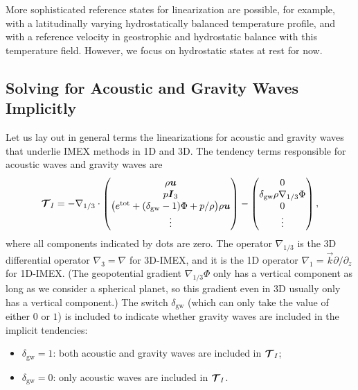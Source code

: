 \documentclass{report}
\begin{document}
{More sophisticated reference states for linearization are possible, for example, with a latitudinally varying hydrostatically balanced temperature profile, and with a reference velocity in geostrophic and hydrostatic balance with this temperature field. However, we focus on hydrostatic states at rest for now. 
 
 \subsection{Solving for Acoustic and Gravity Waves Implicitly}
 \label{s:IMEX_general}

Let us lay out in general terms the linearizations for acoustic and gravity waves that underlie IMEX methods in 1D and 3D. The tendency terms responsible for acoustic waves and gravity waves are
 \begin{equation}
 \boldsymbol{{\mathcal{T}}}_{I}= -\nabla_{1/3} \cdot
 \begin{pmatrix}
 \rho \boldsymbol{{u}} \\
 p \boldsymbol{{I}}_3 \\
 \bigl(e^{\mathrm{tot}} + (\delta_{\mathrm{gw}}-1) \Phi + p/\rho \bigr) \rho \boldsymbol{{u}} \\
 \vdots
 \end{pmatrix}
 - \begin{pmatrix}
 0 \\
 \delta_{\mathrm{gw}} \rho \nabla_{1/3} \Phi \\
 0\\
 \vdots
 \end{pmatrix},
 \label{eq:3d-imex/tendencies}
 \end{equation}
where all components indicated by dots are zero. The operator $\nabla_{1/3}$ is the 3D differential operator $\nabla_3 = \nabla$ for 3D-IMEX, and it is the 1D operator $\nabla_1 = \vec{k} \partial/\partial_z$ for 1D-IMEX. (The geopotential gradient $\nabla_{1/3} \Phi$ only has a vertical component as long as we consider a spherical planet, so this gradient even in 3D usually only has a vertical component.) The switch $\delta_{\mathrm{gw}}$ (which can only take the value of either $0$ or $1$) is included to indicate whether gravity waves are included in the implicit tendencies: 
\begin{itemize}
    \item $\delta_{\mathrm{gw}}=1$: both acoustic and gravity waves are included in $\boldsymbol{{\mathcal{T}}}_I$;
    \item $\delta_{\mathrm{gw}}=0$: only acoustic waves are included in $\boldsymbol{{\mathcal{T}}}_I$.
\end{itemize}

}
\end{document}
